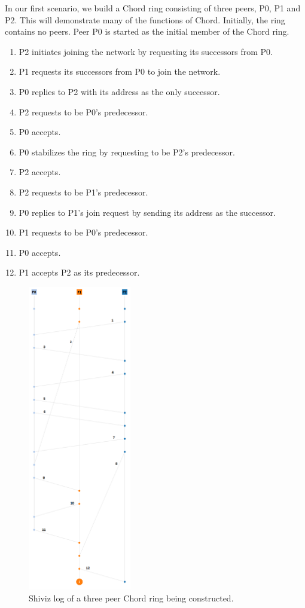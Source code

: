 \documentclass[twocolumn]{article}
\begin{document}
In our first scenario, we build a Chord ring consisting of three peers, P0, P1 and P2. This will demonstrate many of the functions of Chord. Initially, the ring contains no peers. Peer P0 is started as the initial member of the Chord ring.
\begin{enumerate}
  \item P2 initiates joining the network by requesting its successors from P0.
  \item P1 requests its successors from P0 to join the network.
  \item P0 replies to P2 with its address as the only successor.
  \item P2 requests to be P0's predecessor.
  \item P0 accepts.
  \item P0 stabilizes the ring by requesting to be P2's predecessor.
  \item P2 accepts.
  \item P2 requests to be P1's predecessor.
  \item P0 replies to P1's join request by sending its address as the successor.
  \item P1 requests to be P0's predecessor.
  \item P0 accepts.
  \item P1 accepts P2 as its predecessor.
\end{enumerate}

\begin{figure}[tbh!]
  \centering
  \includegraphics[width=0.4\textwidth]{report/images/shiviz_chord2}
  \caption{Shiviz log of a three peer Chord ring being constructed. \label{fig:shiviz_chord}}
\end{figure}
\end{document}
